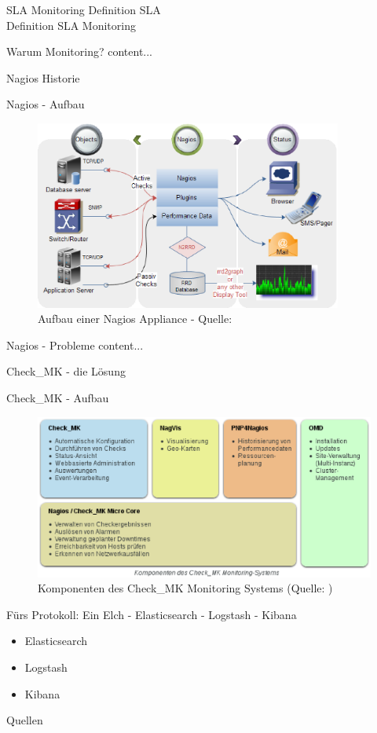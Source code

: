 \documentclass[11pt]{beamer}
\begin{document}
\begin{frame}{SLA Monitoring}
	Definition SLA \\
	Definition SLA Monitoring
\end{frame}
\begin{frame}{Warum Monitoring?}
	content...
\end{frame}
\begin{frame}{Nagios Historie}

\end{frame}
\begin{frame}{Nagios - Aufbau}
	\begin{figure}
		\centering
		\includegraphics[width=0.9\textwidth]{pics/NagiosMonitoring.eps}
		\caption[Grober Aufbau von Nagios]{Aufbau einer Nagios Appliance - Quelle: \textcite{nagiosaufbau}}
	\end{figure}
\end{frame}
\begin{frame}{Nagios - Probleme}
	content...
\end{frame}
\begin{frame}{Check\_MK - die Lösung}
\end{frame}
\begin{frame}{Check\_MK - Aufbau}
	\begin{figure}
		\centering
		\includegraphics[width=1\textwidth]{pics/checkMKAufbau.eps}
		\caption[Komponenten des Check\_MK Monitoring Systems]{Komponenten des Check\_MK Monitoring Systems (Quelle: \textcite{checkmkmonitoringpic})}
	\end{figure}
\end{frame}
\begin{frame}{Fürs Protokoll: Ein Elch - Elasticsearch - Logstash - Kibana}
\begin{itemize}
	\item Elasticsearch
	\item Logstash
	\item Kibana
\end{itemize}
\end{frame}
\begin{frame}{Quellen}
	\printbibliography
\end{frame}
\end{document}
